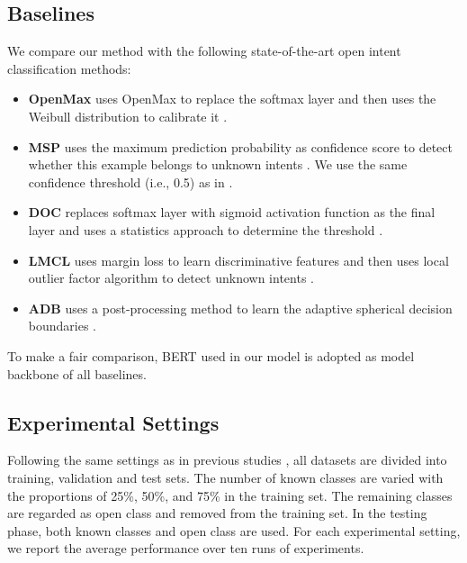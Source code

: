 \documentclass[journal]{IEEEtran}
\begin{document}
\subsection{Baselines}
We compare our method with the following state-of-the-art open intent classification methods:
\begin{itemize}
\item \textbf{OpenMax} uses OpenMax to replace the softmax layer and then uses the Weibull distribution to calibrate it \cite{Bendale16}.
\item \textbf{MSP} uses the maximum prediction probability as confidence score to detect whether this example belongs to unknown intents \cite{Hendrycks17}. We use the same confidence threshold (i.e., 0.5) as in \cite{Lin19,zhang21}.
\item \textbf{DOC} replaces softmax layer with sigmoid activation function as the final layer and uses a statistics approach to determine the threshold \cite{Shu17}.
\item \textbf{LMCL} uses margin loss to learn discriminative features and then uses local outlier factor algorithm to detect unknown intents \cite{Lin19}.
\item \textbf{ADB} uses a post-processing method to learn the adaptive spherical decision boundaries \cite{zhang21}.
\end{itemize}
To make a fair comparison, BERT used in our model is adopted as model backbone of all baselines.

\subsection{Experimental Settings}
Following the same settings as in previous studies \cite{Shu17,Lin19,zhang21}, all datasets are divided into training, validation and test sets.
The number of known classes are varied with the proportions of 25\%, 50\%, and 75\% in the training set.
The remaining classes are regarded as open class and removed from the training set.
In the testing phase, both known classes and open class are used. 
For each experimental setting, we report the average performance over ten runs of experiments.
\end{document}
